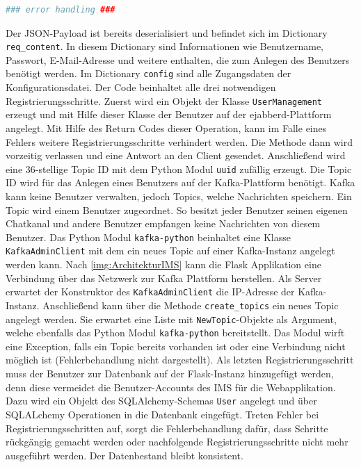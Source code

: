 \documentclass[a4paper,titlepage,halfparskip,12pt]{scrreprt}
\begin{document}
\begin{onehalfspacing}
\begin{lstlisting}[language=python, caption={Code der \acs{API}-Route für die Benutzerregistrierung}, label={lst:flaskRegisterCode}]
    ### error handling ###
\end{lstlisting}

Der \acs{JSON}-Payload ist bereits deserialisiert und befindet sich im Dictionary \texttt{req\_content}. In diesem Dictionary sind Informationen wie Benutzername, Passwort, E-Mail-Adresse und weitere enthalten, die zum Anlegen des Benutzers benötigt werden. Im Dictionary \texttt{config} sind alle Zugangsdaten der Konfigurationsdatei. Der Code beinhaltet alle drei notwendigen Registrierungsschritte. Zuerst wird ein Objekt der Klasse \texttt{UserManagement} erzeugt und mit Hilfe dieser Klasse der Benutzer auf der ejabberd-Plattform angelegt. Mit Hilfe des Return Codes dieser Operation, kann im Falle eines Fehlers weitere Registrierungsschritte verhindert werden. Die Methode dann wird vorzeitig verlassen und eine Antwort an den Client gesendet. Anschließend wird eine 36-stellige Topic ID mit dem Python Modul \texttt{uuid} zufällig erzeugt. Die Topic ID wird für das Anlegen eines Benutzers auf der Kafka-Plattform benötigt. Kafka kann keine Benutzer verwalten, jedoch Topics, welche Nachrichten speichern. Ein Topic wird einem Benutzer zugeordnet. So besitzt jeder Benutzer seinen eigenen Chatkanal und andere Benutzer empfangen keine Nachrichten von diesem Benutzer. Das Python Modul \texttt{kafka-python} \cite{pythonKafka} beinhaltet eine Klasse \texttt{KafkaAdminClient} mit dem ein neues Topic auf einer Kafka-Instanz angelegt werden kann. Nach \autoref{img:ArchitekturIMS} kann die Flask Applikation eine Verbindung über das Netzwerk zur Kafka Plattform herstellen. Als Server erwartet der Konstruktor des \texttt{KafkaAdminClient} die IP-Adresse der Kafka-Instanz. Anschließend kann über die Methode \texttt{create\_topics} ein neues Topic angelegt werden. Sie erwartet eine Liste mit \texttt{NewTopic}-Objekte als Argument, welche ebenfalls das Python Modul \texttt{kafka-python} bereitstellt. Das Modul wirft eine Exception, falls ein Topic bereits vorhanden ist oder eine Verbindung nicht möglich ist (Fehlerbehandlung nicht dargestellt). Als letzten Registrierungsschritt muss der Benutzer zur Datenbank auf der Flask-Instanz hinzugefügt werden, denn diese vermeidet die Benutzer-Accounts des \ac{IMS} für die Webapplikation. Dazu wird ein Objekt des SQLAlchemy-Schemas \texttt{User} angelegt und über SQLALchemy Operationen in die Datenbank eingefügt. Treten Fehler bei Registrierungsschritten auf, sorgt die Fehlerbehandlung dafür, dass Schritte rückgängig gemacht werden oder nachfolgende Registrierungsschritte nicht mehr ausgeführt werden. Der Datenbestand bleibt konsistent.


\end{onehalfspacing}
\end{document}
